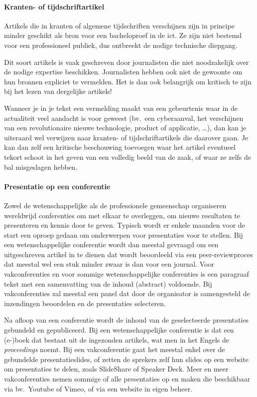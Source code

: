 \paragraph{Kranten- of tijdschriftartikel}

Artikels die in kranten of algemene tijdschriften verschijnen zijn in principe minder geschikt als bron voor een bacheloproef in de ict. Ze zijn niet bestemd voor een professioneel publiek, dus ontbreekt de nodige technische diepgang. 

Dit soort artikels is vaak geschreven door journalisten die niet noodzakelijk over de nodige expertise beschikken. Journalisten hebben ook niet de gewoonte om hun bronnen expliciet te vermelden. Het is dan ook belangrijk om kritisch te zijn bij het lezen van dergelijke artikels!

Wanneer je in je tekst een vermelding maakt van een gebeurtenis waar in de actualiteit veel aandacht is voor geweest (bv.\ een cyberaanval, het verschijnen van een revolutionaire nieuwe technologie, product of applicatie, \ldots), dan kan je uiteraard wel verwijzen naar kranten- of tijdschriftartikels die daarover gaan. Je kan dan zelf een kritische beschouwing toevoegen waar het artikel eventueel tekort schoot in het geven van een volledig beeld van de zaak, of waar ze zelfs de bal misgeslagen hebben.

\paragraph{Presentatie op een conferentie}

Zowel de wetenschappelijke als de professionele gemeenschap organiseren wereldwijd conferenties om met elkaar te overleggen, om nieuwe resultaten te presenteren en kennis door te geven. Typisch wordt er enkele maanden voor de start een oproep gedaan om onderwerpen voor presentaties voor te stellen. Bij een wetenschappelijke conferentie wordt dan meestal gevraagd om een uitgeschreven artikel in te dienen dat wordt beoordeeld via een peer-reviewproces dat meestal wel een stuk minder zwaar is dan voor een journal. Voor vakconferenties en voor sommige wetenschappelijke conferenties is een paragraaf tekst met een samenvatting van de inhoud (abstract) voldoende. Bij vakconferenties zal meestal een panel dat door de organisator is samengesteld de inzendingen beoordelen en de presentaties selecteren.

Na afloop van een conferentie wordt de inhoud van de geselecteerde presentaties gebundeld en gepubliceerd. Bij een wetenschappelijke conferentie is dat een {(e-)boek} dat bestaat uit de ingezonden artikels, wat men in het Engels de \emph{proceedings} noemt. Bij een vakconferentie gaat het meestal enkel over de gebundelde presentatieslides, of zetten de sprekers zelf hun slides op een website om presentaties te delen, zoals SlideShare of Speaker Deck. Meer en meer vakconferenties nemen sommige of alle presentaties op en maken die beschikbaar via bv.~Youtube of Vimeo, of via een website in eigen beheer.

